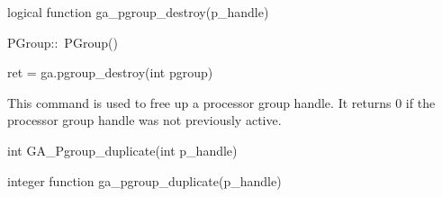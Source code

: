 \documentclass[12pt]{article}
\begin{document}
\begin{fapi}
\begin{fcode}
logical function ga_pgroup_destroy(p_handle)
\end{fcode}
\begin{funcargs}
\end{funcargs}
\end{fapi}

\begin{cxxapi}
\begin{cxxcode}
PGroup::~PGroup()
\end{cxxcode}
\end{cxxapi}

\begin{pyapi}
\begin{pycode}
ret = ga.pgroup_destroy(int pgroup)
\end{pycode}
\begin{funcargs}
\end{funcargs}
\end{pyapi}

\gcoll

\begin{desc}

This command is used to free up a processor group handle. It returns 0 if the
processor group handle was not previously active.

\end{desc}



\begin{capi}
\begin{ccode}
int GA_Pgroup_duplicate(int p_handle)
\end{ccode}
\begin{funcargs}
\end{funcargs}
\end{capi}

\begin{fapi}
\begin{fcode}
integer function ga_pgroup_duplicate(p_handle)
\end{fcode}
\begin{funcargs}
\end{funcargs}
\end{fapi}
\end{document}
